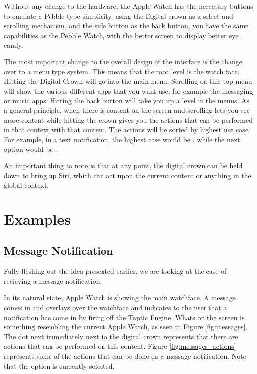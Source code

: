 \documentclass[journal,letterpaper]{article}
\begin{document}
    Without any change to the hardware, the Apple Watch has the neccesary buttons to emulate a Pebble type simplicity. using the Digital crown as a select and scrolling mechanism, and the side button as the back button, you have the same capabilities as the Pebble Watch, with the better screen to display better eye candy.

    The most important change to the overall design of the interface is the change over to a menu type system. This means that the root level is the watch face. Hitting the Digital Crown will go into the main menu. Scrolling on this top menu will show the various different apps that you want use, for example the messaging or music apps. Hitting the back button will take you up a level in the menus. As a general principle, when there is content on the screen and scrolling lets you see more content while hitting the crown gives you the actions that can be performed in that context with that content. The actions will be sorted by highest use case. For example, in a text notification, the highest case would be , while the next option would be .

    An important thing to note is that at any point, the digital crown can be held down to bring up Siri, which can act upon the current content or anything in the global context.

    \section{Examples}
    \label{examples}

    \subsection{Message Notification}

    Fully fleshing out the idea presented earlier, we are looking at the case of recieving a message notification.

    In its natural state, Apple Watch is showing the main watchface. A message comes in and overlays over the watchface and indicates to the user that a notification has come in by firing off the Taptic Engine. Whats on the screen is something resembling the current Apple Watch, as seen in Figure \ref{fig:messages}. The dot next immediately next to the digital crown represents that there are actions that can be performed on this content. Figure \ref{fig:messages_actions} represents some of the actions that can be done on a message notification. Note that the  option is currently selected. 
\end{document}
